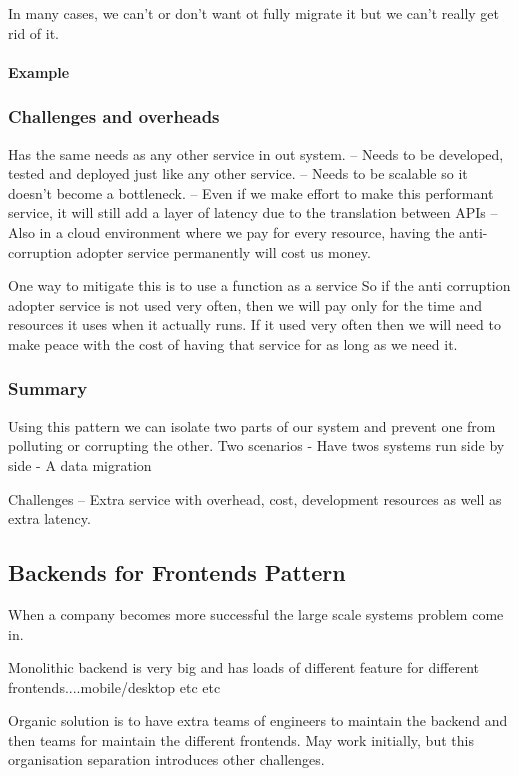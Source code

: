 In many cases, we can't or don't want ot fully migrate it but we can't really get rid of it.

\paragraph{Example}

\subsubsection{Challenges and overheads}
Has the same needs as any other service in out system.
-- Needs to be developed, tested and deployed just like any other service.
-- Needs to be scalable so it doesn't become a bottleneck.
-- Even if we make effort to make this performant service, it will still add a layer of latency due to the translation between APIs
-- Also in a cloud environment where we pay for every resource, having the anti-corruption adopter service permanently will cost us money.

One way to mitigate this is to use a function as a service
So if the anti corruption adopter service is not used very often, then we will pay only for the time and resources it uses when it actually runs.
If it used very often then we will need to make peace with the cost of having that service for as long as we need it.

\subsubsection{Summary}
Using this pattern we can isolate two parts of our system and prevent one from polluting or corrupting the other.
Two scenarios
- Have twos systems run side by side
- A data migration

Challenges
-- Extra service with overhead, cost, development resources as well as extra latency.

\subsection{Backends for Frontends Pattern}
When a company becomes more successful the large scale systems problem come in.

Monolithic backend is very big and has loads of different feature for different frontends....mobile/desktop etc etc

Organic solution is to have extra teams of engineers to maintain the backend and then teams for maintain the different frontends.
May work initially, but this organisation separation introduces other challenges.

